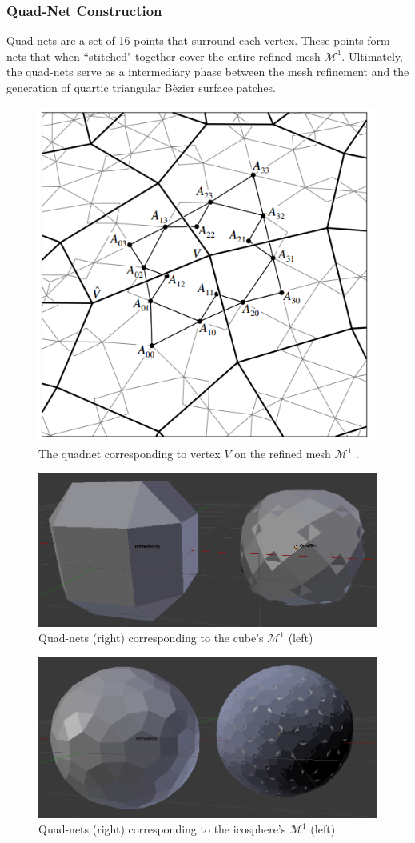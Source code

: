 \documentclass[11pt]{article}
\begin{document}
	\pagebreak
	
	\subsubsection*{Quad-Net Construction}
	Quad-nets are a set of 16 points that surround each vertex. These points form nets that when ``stitched" together cover the entire refined mesh $\mathcal{M}^1$. Ultimately, the quad-nets serve as a intermediary phase between the mesh refinement and the generation of quartic triangular B\`ezier surface patches. 
	\begin{figure}[bp!]
		\centering
		\captionsetup{justification=centering}
		\includegraphics[width=.5\linewidth]{img/loop_quad_net}
		\caption{The quadnet corresponding to vertex $V$ on the refined mesh $\mathcal{M}^1$ \cite{loop1994smooth}.}			
	\end{figure} 	
	\begin{figure}[bp!]
		\vspace{0.35in}
		\centering
		\captionsetup{justification=centering}
		\includegraphics[width=.7\linewidth]{img/quad_cube}
		\caption{Quad-nets (right) corresponding to the cube's $\mathcal{M}^1$ (left)}	
	\end{figure}
	
	\pagebreak

	\begin{figure}[h]
		\centering
		\captionsetup{justification=centering}
		\includegraphics[width=.7\linewidth]{img/quad_icosphere}
		\caption{Quad-nets (right) corresponding to the icosphere's $\mathcal{M}^1$ (left)}	
	\end{figure}
	
\end{document}

